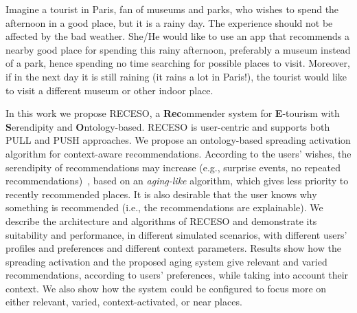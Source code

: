Imagine a tourist in Paris, fan of museums and parks, who wishes to spend the afternoon in a good place, but it is a rainy day. The experience should not be affected by the bad weather. 
She/He would like to use 
an app 
that recommends a nearby good place for spending this rainy afternoon, preferably a museum instead of a park, hence spending no time searching for possible places to visit. Moreover, if in the next day it is still raining (it rains a lot in Paris!), 
the tourist would like to visit a different museum or other %
indoor place.

In this work we propose RECESO, a {\bf Rec}ommender system for {\bf E}-tourism with {\bf S}erendipity and {\bf O}ntology-based. RECESO is
user-centric 
and supports both PULL and PUSH approaches. We propose 
an ontology-based spreading activation algorithm for %
context-aware recommendations. According to the users’ wishes, the serendipity of recommendations may increase (e.g., surprise events, no repeated recommendations)~\cite{kotkov2016survey},
based on an {\it aging-like} algorithm, which gives less priority to recently recommended places.  It is also desirable that the user knows why something is recommended (i.e., 
the recommendations are explainable). We describe the architecture and algorithms of RECESO
and demonstrate its suitability and performance, 
in different simulated scenarios, with different users' profiles and preferences and different context parameters.
Results show how the spreading activation and the proposed aging system 
give 
relevant and varied recommendations, according to users' preferences,
while taking into account their context. We also
show how the system could be configured to focus more on either relevant, varied, context-activated, or near places. 




